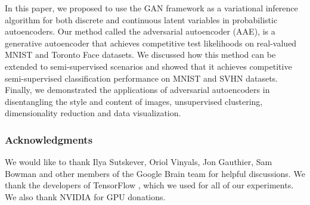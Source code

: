 \documentclass{article}
\begin{document}
In this paper, we proposed to use the GAN framework as a variational inference algorithm for both discrete and continuous latent variables in probabilistic autoencoders. Our method called the adversarial autoencoder (AAE), is a generative autoencoder that achieves competitive test likelihoods on real-valued MNIST and Toronto Face datasets. We discussed how this method can be extended to semi-supervised scenarios and showed that it achieves competitive semi-supervised classification performance on MNIST and SVHN datasets. Finally, we demonstrated the applications of adversarial autoencoders in disentangling the style and content of images, unsupervised clustering, dimensionality reduction and data visualization.

\subsubsection*{Acknowledgments}
We would like to thank Ilya Sutskever, Oriol Vinyals, Jon Gauthier, Sam Bowman and other members of the Google Brain team for helpful discussions. We thank the developers of TensorFlow \citep{tensorflow2015-whitepaper}, which we used for all of our experiments. We also thank NVIDIA for GPU donations. 



\end{document}
